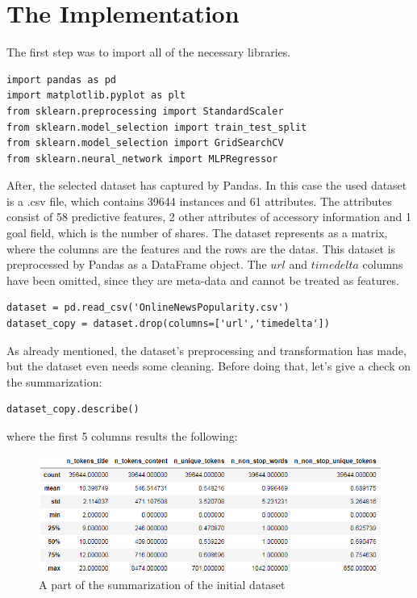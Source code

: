 \section{The Implementation}

The first step was to import all of the necessary libraries.
\begin{lstlisting}
import pandas as pd
import matplotlib.pyplot as plt
from sklearn.preprocessing import StandardScaler
from sklearn.model_selection import train_test_split
from sklearn.model_selection import GridSearchCV
from sklearn.neural_network import MLPRegressor
\end{lstlisting}

After, the selected dataset has captured by Pandas. In this case the used dataset is a .csv file, which contains 39644 instances and 61 attributes. The attributes consist of 58 predictive features, 2 other attributes of accessory information and 1 goal field, which is the number of shares. The dataset represents as a matrix, where the columns are the features and the rows are the datas. This dataset is preprocessed by Pandas as a DataFrame object. The $url$ and $timedelta$ columns have been omitted, since they are meta-data and cannot be treated as features. 
\begin{lstlisting}
dataset = pd.read_csv('OnlineNewsPopularity.csv')
dataset_copy = dataset.drop(columns=['url','timedelta'])
\end{lstlisting}

\medskip As already mentioned, the dataset's preprocessing and transformation has made, but the dataset even needs some cleaning. Before doing that, let's give a check on the summarization:
\begin{lstlisting}
dataset_copy.describe()
\end{lstlisting}
where the first 5 columns results the following:
\begin{figure}[h]
	\centering
	\includegraphics[height=0.34\linewidth]{./figures/describe1}
	\caption{A part of the summarization of the initial dataset}
	\label{fig:describe1}
\end{figure}

